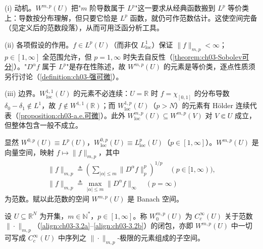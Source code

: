 \documentclass[../../main.tex]{subfiles}%
\begin{document}
\begin{remark}\label{remark:ch03-Sobolev定义动机}
(i) 动机。$W^{m,p}(U)$ 把"$m$ 阶导数属于 $L^p$"这一要求从经典函数搬到 $L^p$ 等价类上：导数按分布理解，但只要它恰是 $L^p$ 函数，就仍可作范数估计。这使空间完备（见定义后的范数段落），从而可用泛函分析工具。

(ii) 各项假设的作用。$f\in L^p(U)$（而非仅 $L^1_{\mathrm{loc}}$）保证 $\|f\|_{m,p}<\infty$；$p\in[1,\infty]$ 全范围允许，但 $p=1,\infty$ 时失去自反性（\cref{theorem:ch03-Sobolev可分}）。"$D^\alpha f$ 属于 $L^p$"是存在性陈述，故 $W^{m,p}(U)$ 的元素是等价类，逐点性质须另行讨论（\cref{definition:ch03-强可微}）。

(iii) 边界。$W^{1,1}_{\mathrm{loc}}(U)$ 的元素不必连续：$U=\mathbb{R}$ 时 $f=\chi_{[0,1]}$ 的分布导数 $\delta_0-\delta_1\notin L^1$，故 $f\notin W^{1,1}(\mathbb{R})$；而 $W^{1,p}_{\mathrm{loc}}(U)$（$p>N$）的元素有 Hölder 连续代表（\cref{proposition:ch03-a.e.可微}）。此外 $W^{m,p}_{\mathrm{loc}}(U)\subseteq W^{m,p}(V)$ 对 $V\Subset U$ 成立，但整体包含一般不成立。
\end{remark}

显然 $W^{0,p}(U)\equiv L^p(U)$，$W^{0,p}_{\mathrm{loc}}(U)\equiv L^p_{\mathrm{loc}}(U)$（$p\in[1,\infty]$）。$W^{m,p}(U)$ 是向量空间，映射 $f\mapsto\|f\|_{m,p}$，其中
\begin{align}
\|f\|_{m,p}\triangleq \left(\sum_{|\alpha|\leqslant m}\|D^\alpha f\|_p^p\right)^{1/p}
\quad (p\in[1,\infty)),\label{align:ch03-3.2a}\\
\|f\|_{m,p}\triangleq \max_{|\alpha|\leqslant m}\|D^\alpha f\|_\infty
\quad (p=\infty)\label{align:ch03-3.2b}
\end{align}
为范数。赋以此范数的空间 $W^{m,p}(U)$ 是 Banach 空间。

\begin{definition}\label{definition:ch03-W0}
设 $U\subseteq\mathbb{R}^N$ 为开集，$m\in\mathbb{N}^*$，$p\in[1,\infty]$。称 $W^{m,p}_0(U)$ 为 $C^\infty_c(U)$ 关于范数 $\|\cdot\|_{m,p}$（\eqref{align:ch03-3.2a}--\eqref{align:ch03-3.2b}）的闭包，亦即 $W^{m,p}(U)$ 中一切可写成 $C^\infty_c(U)$ 中序列之 $\|\cdot\|_{m,p}$-极限的元素组成的子空间。
\end{definition}
\end{document}
